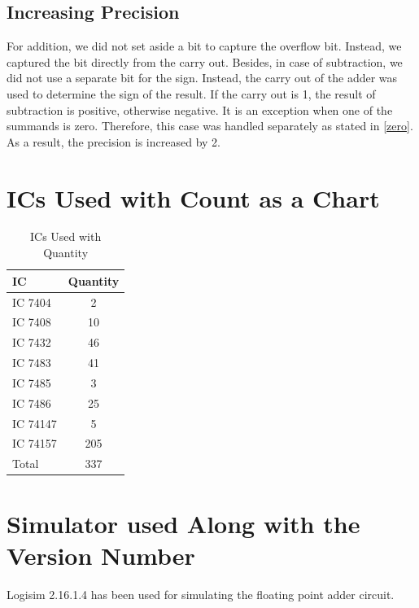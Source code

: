 \documentclass[12pt]{article}
\begin{document}
\subsection{Increasing Precision}
\label{incprec}
For addition, we did not set aside a bit to capture the overflow bit. Instead, we captured the bit directly from the carry out. Besides, in case of subtraction, we did not use a separate bit for the sign. Instead, the carry out of the adder was used to determine the sign of the result. If the carry out is 1, the result of subtraction is positive, otherwise negative. It is an exception when one of the summands is zero. Therefore, this case was handled separately as stated in \ref{zero}. As a result, the precision is increased by 2.

\newpage

\section{\large{ICs Used with Count as a Chart}}
\begin{table}[H]
    \centering
    \begin{tabular}{lc}
         \textbf{IC} & \textbf{Quantity}  \\
         \hline
         \hline
            IC 7404 & 2 \\
            IC 7408 & 10 \\
            IC 7432 & 46 \\ 
            IC 7483 & 41 \\
            IC 7485 & 3 \\
            IC 7486 & 25 \\ 
            IC 74147 & 5 \\ 
            IC 74157 & 205 \\
         \hline
         Total & 337  \\
    \end{tabular}
    \caption{ICs Used with Quantity}
    \label{tab:ic_quantity}
\end{table}
\newpage

\section{\large{Simulator used Along with the Version Number}}
Logisim 2.16.1.4 has been used for simulating the floating point adder circuit.
\end{document}
